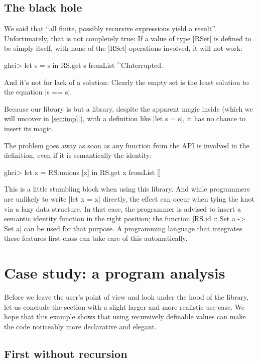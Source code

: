 \documentclass[manuscript,anonymous,screen,acmsmall]{acmart}
\begin{document}
\subsection{The black hole}\label{sec:blackhole}

We said that “all finite, possibly recursive expressions yield a result”. Unfortunately, that is not completely true: If a value of type |RSet| is defined to be simply itself, with none of the |RSet| operations involved, it will not work:
\begin{code}
ghci> let s = s in RS.get s
fromList ^CInterrupted.
\end{code}
And it’s not for lack of a solution: Clearly the empty set is the least solution to the equation |s == s|.

Because our library is but a library, despite the apparent magic inside (which we will uncover in \cref{sec:impl}), with a definition like |let s = s|, it has no chance to insert its magic.

The problem goes away as soon as any function from the API is involved in the definition, even if it is semantically the identity:
\begin{code}
ghci> let x = RS.unions [x] in RS.get x
fromList []
\end{code}

This is a little stumbling block when using this library. And while programmers are unlikely to write |let x = x| directly, the effect can occur when tying the knot via a lazy data structure. In that case, the programmer is advised to insert a semantic identity function in the right position; the function |RS.id :: Set a -> Set a| can be used for that purpose.
A programming language that integrates these features first-class can take care of this automatically.

\section{Case study: a program analysis}\label{sec:casestudy}

Before we leave the user's point of view and look under the hood of the library, let us conclude the section with a slight larger and more realistic use-case. We hope that this example shows that using recursively definable values can make the code noticeably more declarative and elegant.

\subsection{First without recursion}
\end{document}
